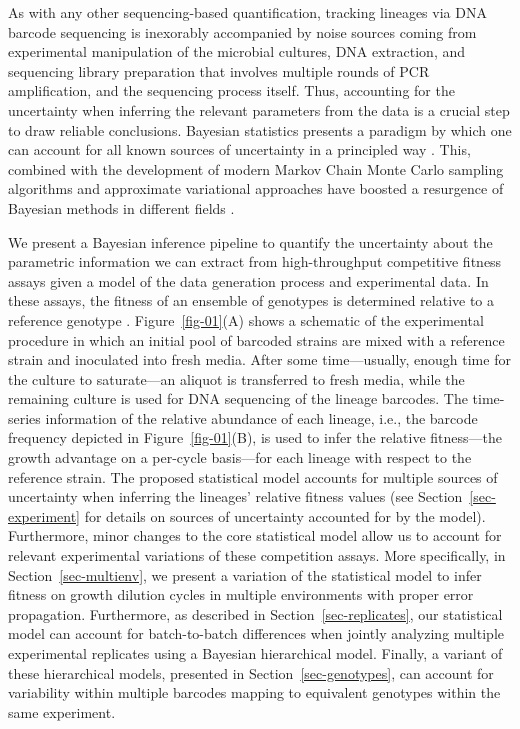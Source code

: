 \documentclass[
  letterpaper,
  DIV=11,
  numbers=noendperiod]{scrartcl}
\begin{document}
\begin{refsegment}
As with any other sequencing-based quantification, tracking lineages via
DNA barcode sequencing is inexorably accompanied by noise sources coming
from experimental manipulation of the microbial cultures, DNA
extraction, and sequencing library preparation that involves multiple
rounds of PCR amplification, and the sequencing process itself. Thus,
accounting for the uncertainty when inferring the relevant parameters
from the data is a crucial step to draw reliable conclusions. Bayesian
statistics presents a paradigm by which one can account for all known
sources of uncertainty in a principled way \autocite{eddy2004a}. This,
combined with the development of modern Markov Chain Monte Carlo
sampling algorithms \autocite{betancourt2017} and approximate
variational approaches \autocite{kucukelbir2016} have boosted a
resurgence of Bayesian methods in different fields
\autocite{efron2013a}.

We present a Bayesian inference pipeline to quantify the uncertainty
about the parametric information we can extract from high-throughput
competitive fitness assays given a model of the data generation process
and experimental data. In these assays, the fitness of an ensemble of
genotypes is determined relative to a reference genotype
\autocite{kinsler2020,ascensao2023}. Figure~\ref{fig-01}(A) shows a
schematic of the experimental procedure in which an initial pool of
barcoded strains are mixed with a reference strain and inoculated into
fresh media. After some time---usually, enough time for the culture to
saturate---an aliquot is transferred to fresh media, while the remaining
culture is used for DNA sequencing of the lineage barcodes. The
time-series information of the relative abundance of each lineage, i.e.,
the barcode frequency depicted in Figure~\ref{fig-01}(B), is used to
infer the relative fitness---the growth advantage on a per-cycle
basis---for each lineage with respect to the reference strain. The
proposed statistical model accounts for multiple sources of uncertainty
when inferring the lineages' relative fitness values (see
Section~\ref{sec-experiment} for details on sources of uncertainty
accounted for by the model). Furthermore, minor changes to the core
statistical model allow us to account for relevant experimental
variations of these competition assays. More specifically, in
Section~\ref{sec-multienv}, we present a variation of the statistical
model to infer fitness on growth dilution cycles in multiple
environments with proper error propagation. Furthermore, as described in
Section~\ref{sec-replicates}, our statistical model can account for
batch-to-batch differences when jointly analyzing multiple experimental
replicates using a Bayesian hierarchical model. Finally, a variant of
these hierarchical models, presented in Section~\ref{sec-genotypes}, can
account for variability within multiple barcodes mapping to equivalent
genotypes within the same experiment.


\end{refsegment}
\end{document}
